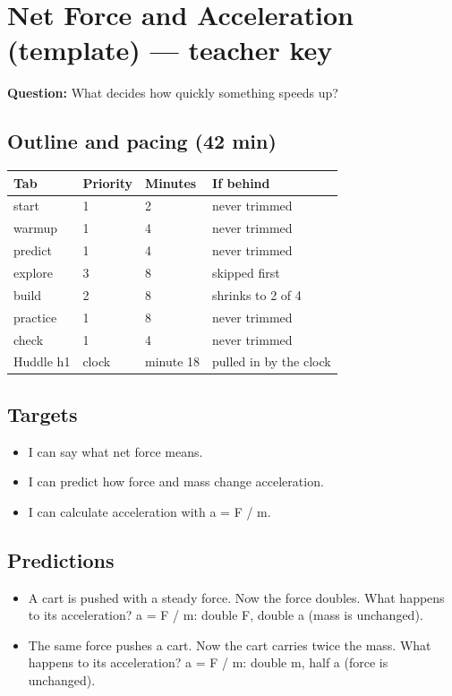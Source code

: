 \documentclass[11pt]{article}
\begin{document}
\section*{Net Force and Acceleration (template) --- teacher key}
\textbf{Question:} What decides how quickly something speeds up?\par
\subsection*{Outline and pacing (42 min)}\begin{tabular}{@{}llll@{}}\toprule Tab & Priority & Minutes & If behind\\\midrule
start & 1 & 2 & never trimmed\\
warmup & 1 & 4 & never trimmed\\
predict & 1 & 4 & never trimmed\\
explore & 3 & 8 & skipped first\\
build & 2 & 8 & shrinks to 2 of 4\\
practice & 1 & 8 & never trimmed\\
check & 1 & 4 & never trimmed\\
Huddle h1 & clock & minute 18 & pulled in by the clock\\
\bottomrule\end{tabular}
\subsection*{Targets}\begin{itemize}\item I can say what net force means.
\item I can predict how force and mass change acceleration.
\item I can calculate acceleration with a = F / m.\end{itemize}
\subsection*{Predictions}\begin{itemize}
\item A cart is pushed with a steady force. Now the force doubles. What happens to its acceleration?  a = F / m: double F, double a (mass is unchanged).
\item The same force pushes a cart. Now the cart carries twice the mass. What happens to its acceleration?  a = F / m: double m, half a (force is unchanged).
\end{itemize}
\end{document}
